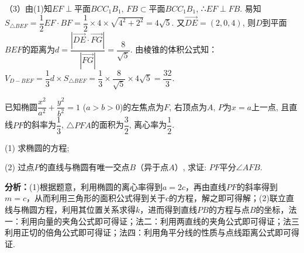 \begin{question}[points=15]
\begin{solution}
（3）由(1)知$EF \perp$平面$BCC_1B_1$, $FB \subset$平面$BCC_1B_1$, ∴$EF \perp FB$. 易知$S_{\triangle BEF} = \dfrac{1}{2} EF \cdot BF = \dfrac{1}{2} \times 4 \times \sqrt{4^2 + 2^2} = 4\sqrt{5}$. 又$\overrightarrow{DE} = (2,0,4)$, 则$D$到平面$BEF$的距离为$d = \dfrac{|\overrightarrow{DE} \cdot \overrightarrow{FG}|}{|\overrightarrow{FG}|} = \dfrac{8}{\sqrt{5}}$. 由棱锥的体积公式知：$V_{D-BEF} = \dfrac{1}{3} d \times S_{\triangle BEF} = \dfrac{1}{3} \times \dfrac{8}{\sqrt{5}} \times 4\sqrt{5} = \dfrac{32}{3}$.
\end{solution}
\end{question}

\begin{question}[points=15]
已知椭圆$\dfrac{x^2}{a^2} + \dfrac{y^2}{b^2} = 1$ ($a > b > 0$)的左焦点为$F$, 右顶点为$A$, $P$为$x = a$上一点, 且直线$PF$的斜率为$\dfrac{1}{3}$, $\triangle PFA$的面积为$\dfrac{3}{2}$, 离心率为$\dfrac{1}{2}$.

(1) 求椭圆的方程;

(2) 过点$P$的直线与椭圆有唯一交点$B$（异于点$A$）, 求证: $PF$平分$\angle AFB$.
\begin{solution}

\textbf{分析：}(1)根据题意，利用椭圆的离心率得到$a=2c$，再由直线$PF$的斜率得到$m=c$，从而利用三角形的面积公式得到关于$c$的方程，解之即可得解；(2)联立直线与椭圆方程，利用其位置关系求得$k$，进而得到直线$PB$的方程与点$B$的坐标，法一：利用向量的夹角公式即可得证；法二：利用两直线的夹角公式即可得证；法三利用正切的倍角公式即可得证；法四：利用角平分线的性质与点线距离公式即可得证.


\end{solution}
\end{question}
